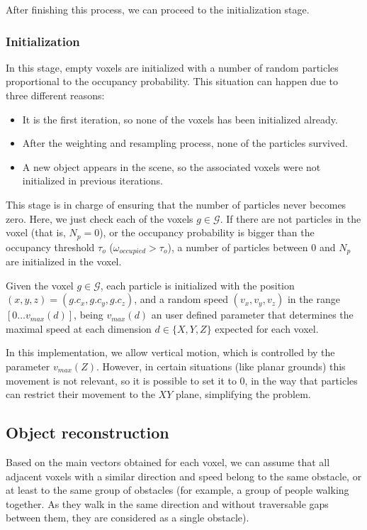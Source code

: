 After finishing this process, we can proceed to the initialization stage.

\subsubsection{Initialization}\label{ch:chapter05_01_04_03}

In this stage, empty voxels are initialized with a number of random particles proportional to the occupancy probability. This situation can happen due to three different reasons:
\begin{itemize}
 \item It is the first iteration, so none of the voxels has been initialized already.
 \item After the weighting and resampling process, none of the particles survived.
 \item A new object appears in the scene, so the associated voxels were not initialized in previous iterations.
\end{itemize}

This stage is in charge of ensuring that the number of particles never becomes zero. Here, we just check each of the voxels $g \in \mathcal{G}$. If there are not particles in the voxel (that is, $N_p = 0$), or the occupancy probability is bigger than the occupancy threshold $\tau_{o}$ ($\omega_{occupied} > \tau_{o}$), a number of particles between 0 and $N_p$ are initialized in the voxel.

Given the voxel $g \in \mathcal{G}$, each particle is initialized with the position $(x, y, z) = (g.c_x, g.c_y, g.c_z)$, and a random speed $(v_x, v_y, v_z)$ in the range $[0\dots v_{max}(d)]$, being $v_{max}(d)$ an user defined parameter that determines the maximal speed at each dimension $d \in \{ X, Y, Z\}$ expected for each voxel. 

In this implementation, we allow vertical motion, which is controlled by the parameter $v_{max}(Z)$. However, in certain situations (like planar grounds) this movement is not relevant, so it is possible to set it to $0$, in the way that particles can restrict their movement to the $XY$ plane, simplifying the problem.

\FloatBarrier

\subsection{Object reconstruction}\label{ch:chapter05_01_05}

Based on the main vectors obtained for each voxel, we can assume that all adjacent voxels with a similar direction and speed belong to the same obstacle, or at least to the same group of obstacles (for example, a group of people walking together. As they walk in the same direction and without traversable gaps between them, they are considered as a single obstacle).

